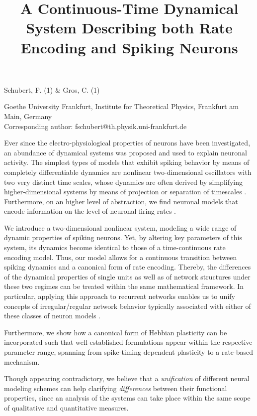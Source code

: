 \documentclass[10pt,a4paper]{article}
\title{A Continuous-Time Dynamical System Describing both Rate Encoding and Spiking Neurons}
\begin{document}
\renewcommand{\refname}{}
\maketitle

\noindent
Schubert, F. (1) \& Gros, C. (1)
\\
\bigskip

 Goethe University Frankfurt, Institute for Theoretical Physics, Frankfurt am Main, Germany
\\
Corresponding author: fschubert@th.physik.uni-frankfurt.de
\bigskip

Ever since the electro-physiological properties of neurons have 
been investigated, an abundance of dynamical systems was proposed 
and used to explain neuronal activity. The simplest types of models 
that exhibit spiking behavior by means of completely differentiable 
dynamics are nonlinear two-dimensional oscillators with two very distinct
time scales, whose dynamics are often derived by simplifying higher-dimensional 
systems by means of projection or separation of timescales \cite{Fitzhugh_1961,Morris_1981}. 
Furthermore, on an higher level of abstraction, we find neuronal models 
that encode information on the level of neuronal firing rates \cite{Gerstner_2002}.

We introduce a two-dimensional nonlinear system, modeling a wide range of 
dynamic properties of spiking neurons. Yet, by altering key parameters of this system, 
its dynamics become identical to those of a time-continuous rate encoding model. Thus, 
our model allows for a continuous transition between spiking dynamics 
and a canonical form of rate encoding. Thereby, the differences  of the dynamical 
properties of single units as well as of network structures under these two 
regimes can be treated within the same mathematical framework. In particular, 
applying this approach to recurrent networks enables us to unify concepts of 
irregular/regular network behavior typically associated with either of 
these classes of neuron models \cite{Sompolinsky_1988,Vreeswijk_1996,Brunel_2000}.

Furthermore, we show how a canonical form of Hebbian plasticity can be incorporated 
such that well-established formulations appear within the respective parameter
range, spanning from spike-timing dependent plasticity to a rate-based mechanism.

Though appearing contradictory, we believe that a \emph{unification} of different neural 
modeling schemes can help clarifying \emph{differences} between their functional properties,
since an analysis of the systems can take place within the same scope of qualitative 
and quantitative measures.


\end{document}
